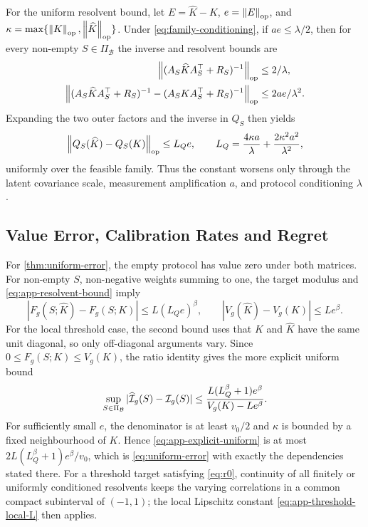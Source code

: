For the uniform resolvent bound, let $E=\widehat K-K$, $e=\left\lVert E \right\rVert_{\mathrm{op}}$, and
$\kappa=\max\{\left\lVert K \right\rVert_{\mathrm{op}},\left\lVert \widehat K \right\rVert_{\mathrm{op}}\}$. Under
\eqref{eq:family-conditioning}, if $ae\le\lambda/2$, then for every non-empty
$S\in\Pi_{\mathcal B}$ the inverse and resolvent bounds are
\begin{equation*}
\begin{aligned}
\left\lVert (A_S\widehat K A_S^\top+R_S)^{-1} \right\rVert_{\mathrm{op}}&\le2/\lambda,\\
\left\lVert (A_S\widehat K A_S^\top+R_S)^{-1}
-(A_SKA_S^\top+R_S)^{-1} \right\rVert_{\mathrm{op}}&\le2ae/\lambda^2.
\end{aligned}
\end{equation*}
Expanding the two outer factors and the inverse in $Q_S$ then yields
\begin{equation}
\left\lVert Q_S(\widehat K)-Q_S(K) \right\rVert_{\mathrm{op}}\le L_Qe,
\qquad
L_Q=\frac{4\kappa a}{\lambda}
    +\frac{2\kappa^2a^2}{\lambda^2},
\label{eq:app-resolvent-bound}
\end{equation}
uniformly over the feasible family. Thus the constant worsens only through the
latent covariance scale, measurement amplification $a$, and protocol
conditioning $\lambda$.

\subsection{Value Error, Calibration Rates and Regret}

For \cref{thm:uniform-error}, the empty protocol has value zero under both
matrices. For non-empty $S$, non-negative weights summing to one, the
target modulus and \eqref{eq:app-resolvent-bound} imply
\begin{equation*}
|F_g(S;\widehat K)-F_g(S;K)|\le L(L_Qe)^\beta,
\qquad
|V_g(\widehat K)-V_g(K)|\le Le^\beta.
\end{equation*}
For the local threshold case, the second bound uses that $K$ and
$\widehat K$ have the same unit diagonal, so only off-diagonal arguments vary.
Since $0\le F_g(S;K)\le V_g(K)$, the ratio identity gives the more explicit
uniform bound
\begin{equation}
\sup_{S\in\Pi_{\mathcal B}}
|\widehat{\mathcal{I}}_g(S)-\mathcal{I}_g(S)|
\le
\frac{L(L_Q^\beta+1)e^\beta}{V_g(K)-Le^\beta}.
\label{eq:app-explicit-uniform}
\end{equation}
For sufficiently small $e$, the denominator is at least $v_0/2$ and
$\kappa$ is bounded by a fixed neighbourhood of $K$. Hence
\eqref{eq:app-explicit-uniform} is at most
$2L(L_Q^\beta+1)e^\beta/v_0$, which is \eqref{eq:uniform-error} with exactly
the dependencies stated there. For a threshold target satisfying
\eqref{eq:r0}, continuity of all finitely or uniformly conditioned resolvents
keeps the varying correlations in a common compact subinterval of $(-1,1)$;
the local Lipschitz constant \eqref{eq:app-threshold-local-L} then applies.


